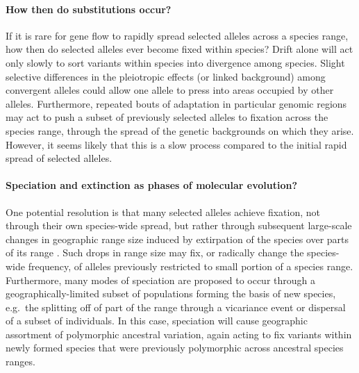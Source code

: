 \documentclass{article}
\newcommand{\plr}[1]{{\it\color{blue}#1}}
\begin{document}
\paragraph{How then do substitutions occur?}
If it is rare for gene flow to rapidly spread selected alleles across a species range, 
how then do selected alleles ever become fixed within species? 
Drift alone will act only slowly to sort variants within species into
divergence among species. 
Slight selective differences in the pleiotropic effects (or linked
  background) among convergent alleles could allow one allele to
  press into areas occupied by other alleles.
Furthermore, repeated bouts of adaptation in particular genomic regions may act 
to push a subset of previously selected alleles to fixation across the
species range, through the spread of the genetic backgrounds on which
they arise.  
However, it seems likely that this is a slow process compared to the
initial rapid spread of selected alleles.
\
\paragraph{Speciation and extinction as phases of molecular evolution?}
One potential resolution is that many selected alleles achieve
fixation, not through their own species-wide spread, but rather
through subsequent large-scale changes in geographic range size
induced by extirpation of the species over parts of its range
\citep[see ][and references therein for how such a model could be constructed]{barton2013modelling}. 
Such drops in range size may fix, or radically change the species-wide frequency, 
of alleles previously restricted to small portion of a species range. 
Furthermore, many modes of speciation are proposed to occur through a
geographically-limited subset of populations forming the basis of new species, 
e.g.\ the splitting off of part of the range through a vicariance event 
or dispersal of a subset of individuals. 
In this case, speciation will cause geographic assortment of
polymorphic ancestral variation, again acting to fix variants within
newly formed species that were previously polymorphic across ancestral species ranges. 
\end{document}
